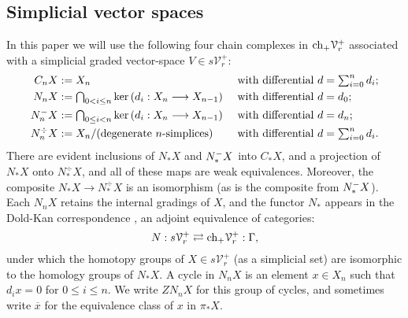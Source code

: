 \documentclass[11pt]{amsart}
\theoremstyle{plain}
\theoremstyle{definition}
\renewcommand{\ker}{\textup{ker}\,}
\renewcommand{\to}{\longrightarrow}
\newcommand{\calV}{\mathcal{V}}
\theoremstyle{plain}
\newcommand{\vect}[2]{\calV^{#1}_{#2}}
\newcommand{\Nop}{N^{\smash{-}}}
\newcommand{\complexes}{\textup{ch}_+}
\begin{document}
\begin{Conventions and notation}
\subsection{Simplicial vector spaces}
In this paper we will use the following four chain complexes in $\complexes \vect{+}{r}$ associated with a simplicial graded vector-space $V\in s\vect{+}{r}$:
\begin{alignat*}{2}
C_nX&:=X_n&& \textup{ with differential }d=\textstyle\sum_{i=0}^{n}d_i;\\
N_nX&:=\textstyle\bigcap_{0< i\leq n}\ker(d_i:X_n\to X_{n-1})&& \textup{ with differential }d=d_0;\\
\Nop_nX&:=\textstyle\bigcap_{0\leq i< n}\ker(d_i:X_n\to X_{n-1})&& \textup{ with differential }d=d_n;\\
N_n^\div X&:=X_n/(\textup{degenerate $n$-simplices})&& \textup{ with differential }d=\textstyle\sum_{i=0}^{n}d_i.
\end{alignat*}
There are evident inclusions of $N_*X$ and $\Nop_*X$ into $C_*X$, and a projection of $N_*X$ onto $N_*^\div X$, and all of these maps are weak equivalences. Moreover, the composite $N_*X\to N_*^\div X$ is an isomorphism (as is the composite from $\Nop_*X$). Each $N_nX$ retains the internal gradings of $X$, and the functor $N_*$ appears in the Dold-Kan correspondence \cite[\S III.2]{goerss-jardine.pdf}, an adjoint equivalence of categories:
\[N:s\vect{+}{r}\rightleftarrows \complexes \vect{+}{r}:\Gamma,\]
under which the homotopy groups of $X\in s\vect{+}{r}$ (as a simplicial set)  are isomorphic to the homology groups of $N_*X$.
%
A cycle in $N_nX$ is an element $x\in X_n$ such that $d_ix=0$ for $0\leq i\leq n$. We write $ZN_nX$ for this group of cycles, and sometimes write $\overline{x}$ for the equivalence class of $x$ in $\pi_*X$.


\end{Conventions and notation}
\end{document}
